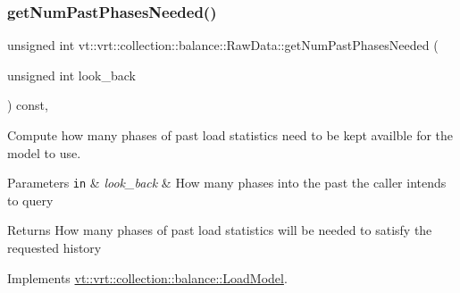 \mbox{\label{structvt_1_1vrt_1_1collection_1_1balance_1_1_raw_data_ad81a96c22f81405e93bf162e6aafbeed}} 
\subsubsection{\texorpdfstring{get\+Num\+Past\+Phases\+Needed()}{getNumPastPhasesNeeded()}}
{\footnotesize\ttfamily unsigned int vt\+::vrt\+::collection\+::balance\+::\+Raw\+Data\+::get\+Num\+Past\+Phases\+Needed (\begin{DoxyParamCaption}\item[{unsigned int}]{look\+\_\+back }\end{DoxyParamCaption}) const\hspace{0.3cm}{\ttfamily [override]}, {\ttfamily [virtual]}}



Compute how many phases of past load statistics need to be kept availble for the model to use. 


\begin{DoxyParams}[1]{Parameters}
\mbox{\tt in}  & {\em look\+\_\+back} & How many phases into the past the caller intends to query\\
\hline
\end{DoxyParams}
\begin{DoxyReturn}{Returns}
How many phases of past load statistics will be needed to satisfy the requested history 
\end{DoxyReturn}


Implements \hyperlink{structvt_1_1vrt_1_1collection_1_1balance_1_1_load_model_a44905eb3e15e7f22b2f8d1fe7297cea0}{vt\+::vrt\+::collection\+::balance\+::\+Load\+Model}.

\mbox{\label{structvt_1_1vrt_1_1collection_1_1balance_1_1_raw_data_a252d51c7265f225736068a4ae87b4a0a}} 
